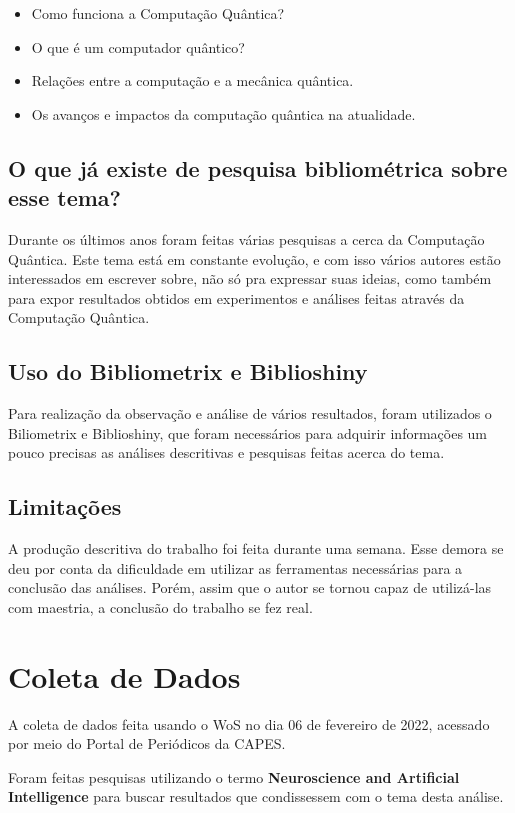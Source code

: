 \begin{itemize}
    \item Como funciona a Computação Quântica?
    \item O que é um computador quântico?
    \item Relações entre a computação e a mecânica quântica.
    \item Os avanços e impactos da computação quântica na atualidade.
\end{itemize}

\subsection{O que já existe de pesquisa bibliométrica sobre esse tema?}

Durante os últimos anos foram feitas várias pesquisas a cerca da Computação Quântica. Este tema está em constante evolução, e com isso vários autores estão interessados em escrever sobre, não só pra expressar suas ideias, como também para expor resultados obtidos em experimentos e análises feitas através da Computação Quântica.

\subsection{Uso do Bibliometrix e Biblioshiny}
Para realização da observação e análise de vários resultados, foram utilizados o Biliometrix e Biblioshiny, que foram necessários para adquirir informações um pouco precisas as análises descritivas e pesquisas feitas acerca do tema.

\subsection{Limitações}
A produção descritiva do trabalho foi feita durante uma semana. Esse demora se deu por conta da dificuldade em utilizar as ferramentas necessárias para a conclusão das análises. Porém, assim que o autor se tornou capaz de utilizá-las com maestria, a conclusão do trabalho se fez real.

\section{Coleta de Dados}

A coleta de dados feita usando o WoS no dia 06 de fevereiro de 2022, acessado por meio do Portal de Periódicos da CAPES.

Foram feitas pesquisas utilizando o termo \textbf{Neuroscience and Artificial Intelligence} para buscar resultados que condissessem com o tema desta análise.


